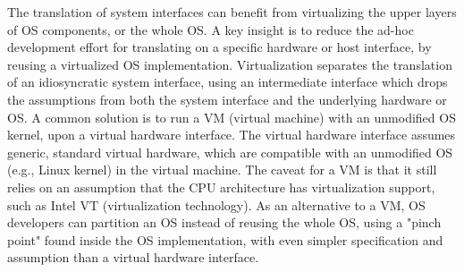 The translation of system interfaces
can benefit from virtualizing the upper layers of OS components,
or the whole OS. 
A key insight is to reduce the ad-hoc development effort for translating on a specific hardware or host interface, by reusing a virtualized OS implementation.
Virtualization separates the translation of an idiosyncratic system interface,
using an intermediate interface which drops the assumptions
from both the system interface and the underlying hardware or OS.
A common solution is to run a VM (virtual machine) with an unmodified OS kernel, upon a virtual hardware interface.
The virtual hardware interface 
assumes generic, standard virtual hardware, %
which are compatible with an unmodified OS (e.g., Linux kernel) in the virtual machine.
The caveat for a VM
is that it still relies on an assumption
that the CPU architecture has virtualization support,
such as Intel VT (virtualization technology).
As an alternative to a VM, OS developers can partition an OS instead of reusing the whole OS,
using a "pinch point" found inside the OS implementation,
with even simpler specification and assumption than a virtual hardware interface.




